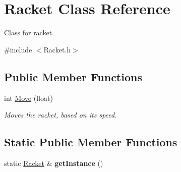 \hypertarget{class_racket}{}\section{Racket Class Reference}
\label{class_racket}


Class for racket.  




{\ttfamily \#include $<$Racket.\+h$>$}

\subsection*{Public Member Functions}
\begin{DoxyCompactItemize}
\item 
int \hyperlink{class_racket_aed265c7633d22165e3ad30b4dfa6c7f8}{Move} (float)
\begin{DoxyCompactList}\small\item\em Moves the racket, based on its speed. \end{DoxyCompactList}\end{DoxyCompactItemize}
\subsection*{Static Public Member Functions}
\begin{DoxyCompactItemize}
\item 
\mbox{\label{class_racket_a4f0c0c96b24dedc89b29862ac9b47ccd}} 
static \hyperlink{class_racket}{Racket} \& {\bfseries get\+Instance} ()
\end{DoxyCompactItemize}
